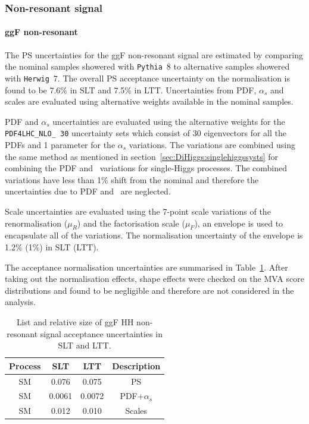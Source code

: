 \subsubsection{Non-resonant signal}

\paragraph{ggF non-resonant}
The PS uncertainties for the ggF non-resonant signal
are estimated by comparing the nominal samples showered with 
\texttt{Pythia}~8 to alternative samples showered with \texttt{Herwig}~7. 
The overall PS acceptance uncertainty
on the normalisation is found to be 
7.6\% in SLT and 7.5\% in LTT.
Uncertainties from PDF, $\alpha_s$ and scales are 
evaluated using alternative weights available in the nominal samples.

PDF and $\alpha_s$ uncertainties are evaluated
using the alternative weights for the \texttt{PDF4LHC\_NLO\_ 30}
uncertainty sets which consist of 30 eigenvectors for
all the PDFs and 1 parameter for the $\alpha_s$ variations.
The variations are combined using the same method as mentioned in 
section~\ref{sec:DiHiggs:singlehiggssysts} for combining the
PDF and \alphas\ variations for single-Higgs processes.
The combined variations have less than 1\% shift from the nominal and
therefore the uncertainties due to PDF and \alphas\ are neglected.

Scale uncertainties are evaluated using the 7-point scale variations 
of the renormalisation ($\mu_R$) and the factorisation scale ($\mu_F$), 
an envelope is used to encapsulate all of the variations.
The normalisation uncertainty of the envelope is 1.2\% (1\%) in SLT (LTT).

The acceptance normalisation uncertainties are summarised in 
Table~\ref{sec:systs:tab:systematics_HHNonResSignal_AcceptanceNumbers}.
After taking out the normalisation effects, 
shape effects were checked on the MVA score distributions and found to 
be negligible and therefore are not considered in the analysis.

\begin{table}
\centering
\small
\begin{tabular}{|c|c|c|c|}
\hline
Process & SLT & LTT & Description\\
\hline
SM  & 0.076 & 0.075 & PS\\
SM &  0.0061 &  0.0072 & PDF+$\alpha_s$\\ 
SM & 0.012 &  0.010 & Scales \\
\hline
\end{tabular}
\caption{List and relative size of ggF HH non-resonant signal acceptance uncertainties in SLT and LTT.}
\label{sec:systs:tab:systematics_HHNonResSignal_AcceptanceNumbers}
\end{table}


